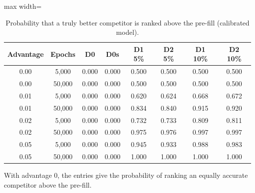 \begin{table}[h!]
\centering
\footnotesize
\caption{Probability that a truly better competitor is ranked above the pre-fill (calibrated model).}
\label{tab:s-ranking}
\begin{adjustbox}{max width=\linewidth}
\begin{tabular}{cccccccc}
\toprule
Advantage & Epochs & D0 & D0s & D1 5\% & D2 5\% & D1 10\% & D2 10\% \\
\midrule
0.00 & 5{,}000 & 0.000 & 0.000 & 0.500 & 0.500 & 0.500 & 0.500 \\
0.00 & 50{,}000 & 0.000 & 0.000 & 0.500 & 0.500 & 0.500 & 0.500 \\
0.01 & 5{,}000 & 0.000 & 0.000 & 0.620 & 0.624 & 0.668 & 0.672 \\
0.01 & 50{,}000 & 0.000 & 0.000 & 0.834 & 0.840 & 0.915 & 0.920 \\
0.02 & 5{,}000 & 0.000 & 0.000 & 0.732 & 0.733 & 0.809 & 0.811 \\
0.02 & 50{,}000 & 0.000 & 0.000 & 0.975 & 0.976 & 0.997 & 0.997 \\
0.05 & 5{,}000 & 0.000 & 0.000 & 0.945 & 0.933 & 0.988 & 0.983 \\
0.05 & 50{,}000 & 0.000 & 0.000 & 1.000 & 1.000 & 1.000 & 1.000 \\
\bottomrule
\end{tabular}
\end{adjustbox}
\par\smallskip
\begin{minipage}{0.95\linewidth}\footnotesize With advantage 0, the entries give the probability of ranking an equally accurate competitor above the pre-fill.\end{minipage}
\end{table}
